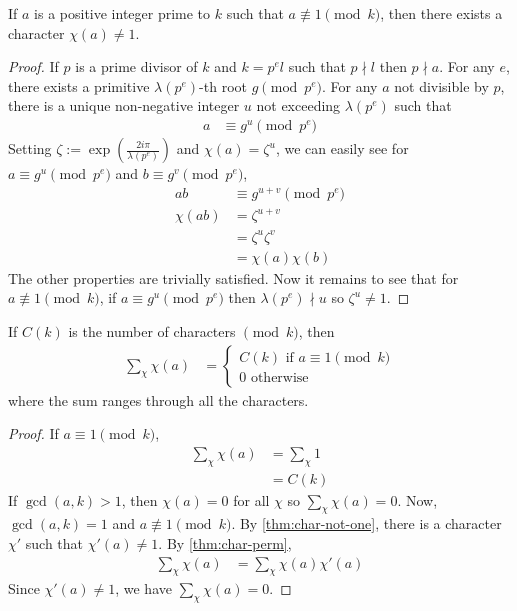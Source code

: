 \documentclass[elemannt.tex]{subfile}
\begin{document}
		\begin{theorem}\label{thm:char-not-one}
			If $a$ is a positive integer prime to $k$ such that $a\not\equiv1\pmod{k}$, then there exists a character $\chi(a)\neq1$.
		\end{theorem}

		\begin{proof}
			If $p$ is a prime divisor of $k$ and $k=p^{e}l$ such that $p\nmid l$ then $p\nmid a$. For any $e$, there exists a primitive $\lambda(p^{e})$-th root $g\pmod{p^{e}}$. For any $a$ not divisible by $p$, there is a unique non-negative integer $u$ not exceeding $\lambda(p^{e})$ such that
				\begin{align*}
					a
						& \equiv g^{u}\pmod{p^{e}}
				\end{align*}
			Setting $\zeta:=\exp\left(\frac{2i\pi}{\lambda(p^{e})}\right)$ and $\chi(a)=\zeta^{u}$, we can easily see for $a\equiv g^{u}\pmod{p^{e}}$ and $b\equiv g^{v}\pmod{p^{e}}$,
				\begin{align*}
					ab
						& \equiv g^{u+v}\pmod{p^{e}}\\
					\chi(ab)
						& = \zeta^{u+v}\\
						& =\zeta^{u}\zeta^{v}\\
						& = \chi(a)\chi(b)
				\end{align*}
			The other properties are trivially satisfied. Now it remains to see that for $a\not\equiv1\pmod{k}$, if $a\equiv g^{u}\pmod{p^{e}}$ then $\lambda(p^{e})\nmid u$ so $\zeta^{u}\neq1$.
		\end{proof}

		\begin{theorem}\label{thm:sum-for-char}
			If $C(k)$ is the number of characters $\pmod{k}$, then
				\begin{align*}
					\sum_{\chi}\chi(a)
						& =
							\begin{cases}
								C(k)\mbox{ if }a\equiv1\pmod{k}\\
								0\mbox{ otherwise}
							\end{cases}
				\end{align*}
			where the sum ranges through all the characters.
		\end{theorem}

		\begin{proof}
			If $a\equiv1\pmod{k}$,
				\begin{align*}
					\sum_{\chi}\chi(a)
						& = \sum_{\chi}1\\
						& = C(k)
				\end{align*}
			If $\gcd(a,k)>1$, then $\chi(a)=0$ for all $\chi$ so $\sum_{\chi}\chi(a)=0$. Now, $\gcd(a,k)=1$ and $a\not\equiv1\pmod{k}$. By \autoref{thm:char-not-one}, there is a character $\chi'$ such that $\chi'(a)\neq1$. By \autoref{thm:char-perm},
				\begin{align*}
					\sum_{\chi}\chi(a)
						& = \sum_{\chi}\chi(a)\chi'(a)
				\end{align*}
			Since $\chi'(a)\neq1$, we have $\sum_{\chi}\chi(a)=0$.
		\end{proof}
\end{document}
